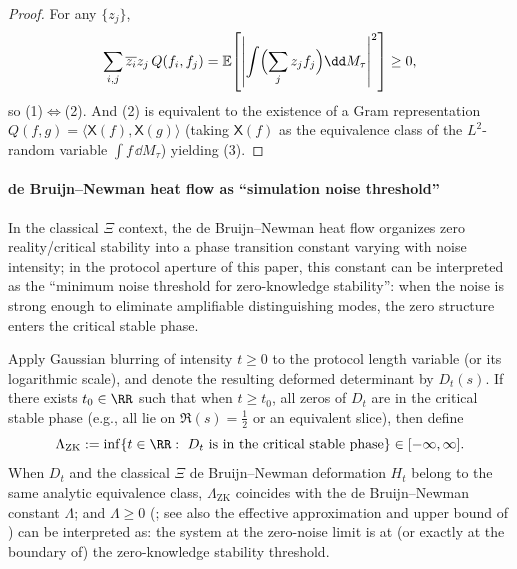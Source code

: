 \begin{proof}
For any \(\{z_j\}\),
\[
\sum_{i,j}\overline{z_i}z_j\,Q(f_i,f_j)
=
\mathbb{E}\!\left[\left|\int \Bigl(\sum_j z_j f_j\Bigr)\dd M_{\tau}\right|^{2}\right]\ge 0,
\]
so (1)\(\Leftrightarrow\)(2).
And (2) is equivalent to the existence of a Gram representation \(Q(f,g)=\langle \mathsf{X}(f),\mathsf{X}(g)\rangle\) (taking \(\mathsf{X}(f)\) as the equivalence class of the \(L^2\)-random variable \(\int f\,\dd M_{\tau}\)) yielding (3). \qedhere
\end{proof}

\paragraph{de Bruijn--Newman heat flow as ``simulation noise threshold''}
In the classical \(\Xi\) context, the de Bruijn--Newman heat flow organizes zero reality/critical stability into a phase transition constant varying with noise intensity;
in the protocol aperture of this paper, this constant can be interpreted as the ``minimum noise threshold for zero-knowledge stability'': when the noise is strong enough to eliminate amplifiable distinguishing modes, the zero structure enters the critical stable phase.

\begin{definition}\label{def:xi-hzom-zk-newman-constant}
Apply Gaussian blurring of intensity \(t\ge 0\) to the protocol length variable (or its logarithmic scale), and denote the resulting deformed determinant by \(D_t(s)\).
If there exists \(t_0\in\RR\) such that when \(t\ge t_0\), all zeros of \(D_t\) are in the critical stable phase (e.g., all lie on \(\Re(s)=\tfrac12\) or an equivalent slice), then define
\[
\Lambda_{\mathrm{ZK}}:=\inf\{t\in\RR:\ D_t\ \text{is in the critical stable phase}\}\in[-\infty,\infty].
\]
When \(D_t\) and the classical \(\Xi\) de Bruijn--Newman deformation \(H_t\) belong to the same analytic equivalence class, \(\Lambda_{\mathrm{ZK}}\) coincides with the de Bruijn--Newman constant \(\Lambda\); and \(\Lambda\ge 0\) (\cite{RodgersTao2018NewmanNonnegative}; see also the effective approximation and upper bound of \cite{Polymath2019NewmanUpper}) can be interpreted as: the system at the zero-noise limit is at (or exactly at the boundary of) the zero-knowledge stability threshold.
\end{definition}

